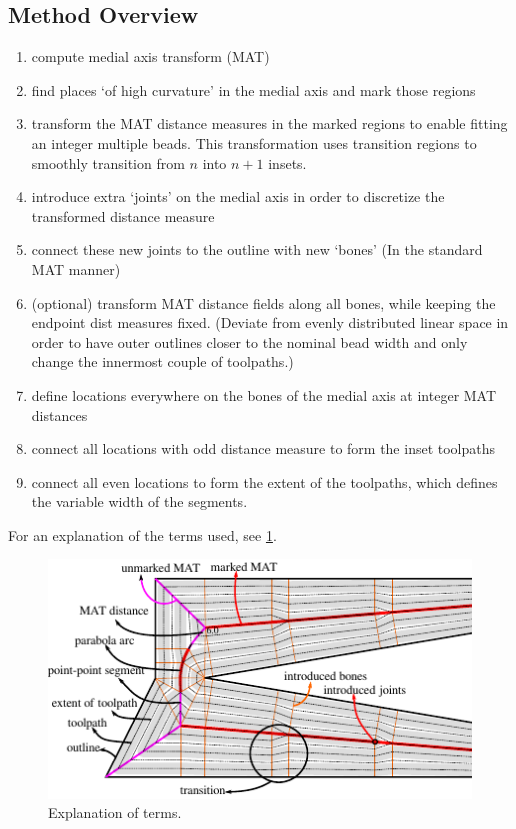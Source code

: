 \subsection{Method Overview}
\begin{enumerate}
\item compute medial axis transform (MAT)
\item find places `of high curvature' in the medial axis and mark those regions
\item transform the MAT distance measures in the marked regions to enable fitting an integer multiple beads.
		This transformation uses transition regions to smoothly transition from $n$ into $n+1$ insets.
\item introduce extra `joints' on the medial axis in order to discretize the transformed distance measure
\item connect these new joints to the outline with new `bones' (In the standard MAT manner)
\item (optional) transform MAT distance fields along all bones, while keeping the endpoint dist measures fixed. (Deviate from evenly distributed linear space in order to have outer outlines closer to the nominal bead width and only change the innermost couple of toolpaths.)
\item define locations everywhere on the bones of the medial axis at integer MAT distances
\item connect all locations with odd distance measure to form the inset toolpaths
\item connect all even locations to form the extent of the toolpaths, which defines the variable width of the segments.
\end{enumerate}


For an explanation of the terms used, see \cref{legend}.

\begin{figure}
\includegraphics[width=\columnwidth]{sources/method/legend_double_wedge_example.pdf}
\caption{Explanation of terms.}
\label{legend}
\end{figure}



